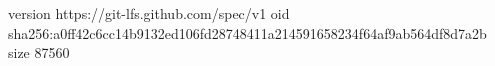 version https://git-lfs.github.com/spec/v1
oid sha256:a0ff42c6cc14b9132ed106fd28748411a214591658234f64af9ab564df8d7a2b
size 87560
